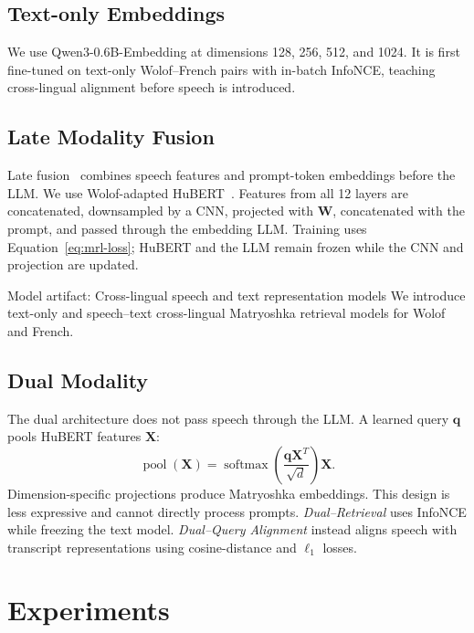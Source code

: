 \subsection{Text-only Embeddings}
We use Qwen3-0.6B-Embedding at dimensions 128, 256, 512, and 1024. It is first fine-tuned on text-only Wolof--French pairs with in-batch InfoNCE, teaching cross-lingual alignment before speech is introduced.

\subsection{Late Modality Fusion}
Late fusion~\citep{llava,llamaspeech} combines speech features and prompt-token embeddings before the LLM. We use Wolof-adapted HuBERT~\citep{sy2025speechlanguagemodelsunderrepresented}. Features from all 12 layers are concatenated, downsampled by a CNN, projected with \(\mathbf{W}\), concatenated with the prompt, and passed through the embedding LLM. Training uses Equation~\ref{eq:mrl-loss}; HuBERT and the LLM remain frozen while the CNN and projection are updated.

\begin{insightbox}{Model artifact: Cross-lingual speech and text representation models}
We introduce text-only and speech--text cross-lingual Matryoshka retrieval models for Wolof and French.
\end{insightbox}

\subsection{Dual Modality}
The dual architecture does not pass speech through the LLM. A learned query \(\mathbf{q}\) pools HuBERT features \(\mathbf{X}\):
\begin{equation}
    \operatorname{pool}(\mathbf{X})
    =\operatorname{softmax}\left(\frac{\mathbf{q}\mathbf{X}^{T}}{\sqrt{d}}\right)\mathbf{X}.
\end{equation}
Dimension-specific projections produce Matryoshka embeddings. This design is less expressive and cannot directly process prompts. \emph{Dual--Retrieval} uses InfoNCE while freezing the text model. \emph{Dual--Query Alignment} instead aligns speech with transcript representations using cosine-distance and \(\ell_1\) losses.

\section{Experiments}

